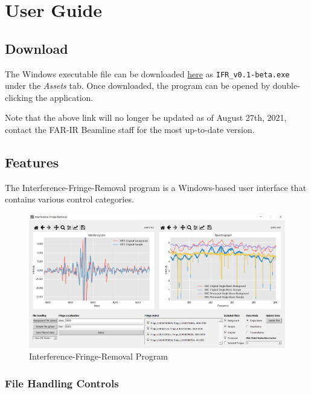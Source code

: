 \documentclass[a4paper, 12pt]{report}
\begin{document}
    
    
    \chapter{User Guide}

    \section{Download}

    The Windows executable file can be downloaded \href{https://github.com/JaiWillems/Interference-Fringe-Removal/releases/tag/v0.1-beta}{here} as \verb|IFR_v0.1-beta.exe| under the \textit{Assets} tab. Once downloaded, the program can be opened by double-clicking the application.
    
    Note that the above link will no longer be updated as of August 27th, 2021, contact the FAR-IR Beamline staff for the most up-to-date version.

    \section{Features}

    The Interference-Fringe-Removal program is a Windows-based user interface that contains various control categories.
    
    \begin{figure}[h]
        \centering
        \includegraphics[width=\textwidth]{figures/ui_display.png}
        \caption{Interference-Fringe-Removal Program}
        \label{fig:2}
    \end{figure}
    
    \subsection{File Handling Controls}
    
\end{document}
